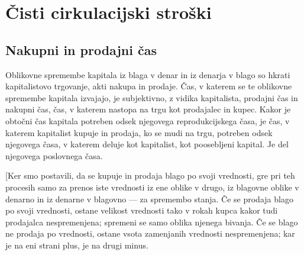 \documentclass[kapital_02.tex]{subfiles}
\begin{document}
\KPEstran %
\section{Čisti cirkulacijski stroški}
\subsection{Nakupni in prodajni čas}
Oblikovne spremembe kapitala iz blaga v denar in iz denarja v blago so hkrati kapitalistovo trgovanje, akti nakupa in prodaje.
Čas, v katerem se te oblikovne spremembe kapitala izvajajo, je subjektivno, z vidika kapitalista, prodajni čas in nakupni čas, čas, v katerem nastopa na trgu kot prodajalec in kupec.
Kakor je obtočni čas kapitala potreben odsek njegovega reprodukcijskega časa, je čas, v katerem kapitalist kupuje in prodaja, ko se mudi na trgu, potreben odsek njegovega časa, v katerem deluje kot kapitalist, kot poosebljeni kapital. 
Je del njegovega poslovnega časa.

[Ker smo postavili, da se kupuje in prodaja blago po svoji vrednosti, gre pri teh procesih samo za prenos iste vrednosti iz ene oblike v drugo, iz blagovne oblike v denarno in iz denarne v blagovno — za spremembo stanja.
Če se prodaja blago po svoji vrednosti, ostane velikost vrednosti tako v rokah kupca kakor tudi prodajalca nespremenjena; spremeni se samo oblika njenega bivanja.
Če se blago ne prodaja po vrednosti, ostane vsota zamenjanih vrednosti nespremenjena; kar je na eni strani plus, je na drugi minus.
\end{document}
